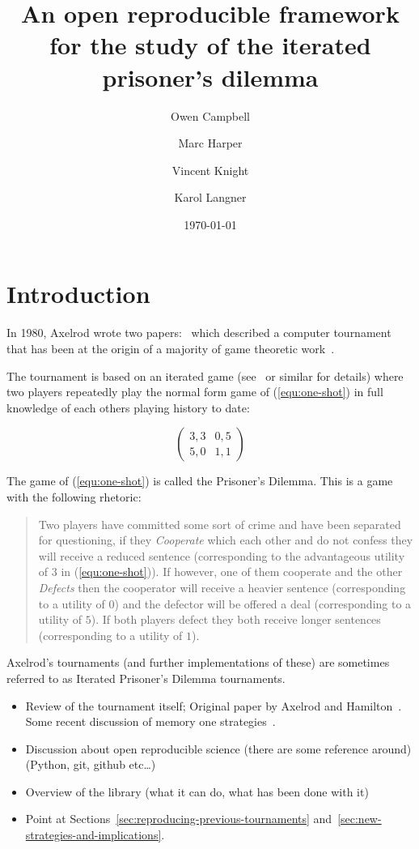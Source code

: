 \documentclass{article}
\title{An open reproducible framework for the study of the iterated prisoner's
dilemma}
\author{Owen Campbell\\
        \and
        Marc Harper\\
        \and
        Vincent Knight\\
        \and
        Karol Langner\\
}
\date{\today}
\begin{document}
\maketitle

\section{Introduction}\label{sec:introduction}

In 1980, Axelrod wrote two papers:~\cite{Axelrod1980a,Axelrod1980b} which
described a computer tournament that has been at the origin of a majority of
game theoretic work~\cite{readallthepapers}.

The tournament is based on an iterated game (see~\cite{Maschler2013} or similar
for details) where two players repeatedly play the normal form game of
(\ref{equ:one-shot}) in full knowledge of each others playing history to date:

\begin{equation}
    \begin{pmatrix}
        3,3 & 0,5\\
        5,0 & 1,1
    \end{pmatrix}
    \label{equ:one-shot}
\end{equation}

The game of (\ref{equ:one-shot}) is called the Prisoner's Dilemma. This is a game with the following rhetoric:

\begin{quote}
    Two players have committed some sort of crime and have been separated for
    questioning, if they \textit{Cooperate} which each other and do not confess
    they will receive a reduced sentence (corresponding to the advantageous utility
    of \(3\) in (\ref{equ:one-shot})). If however, one of them cooperate and the
    other \textit{Defects} then the cooperator will receive a heavier sentence
    (corresponding to a utility of \(0\)) and the defector will be offered a deal
    (corresponding to a utility of \(5\)). If both players defect they both receive
    longer sentences (corresponding to a utility of \(1\)).
\end{quote}

Axelrod's tournaments (and further implementations of these) are sometimes
referred to as Iterated Prisoner's Dilemma tournaments.

\begin{itemize}
\item Review of the tournament itself;
      Original paper by Axelrod and Hamilton~\cite{1981-Axelrod-Hamilton}.
      Some recent discussion of memory one strategies~\cite{press2012iterated, stewart2012extortion}.

\item Discussion about open reproducible science (there are some reference
      around) (Python, git, github etc\dots)
\item Overview of the library (what it can do, what has been done with it)
\item Point at Sections~\ref{sec:reproducing-previous-tournaments}
      and~\ref{sec:new-strategies-and-implications}.
\end{itemize}
\end{document}

